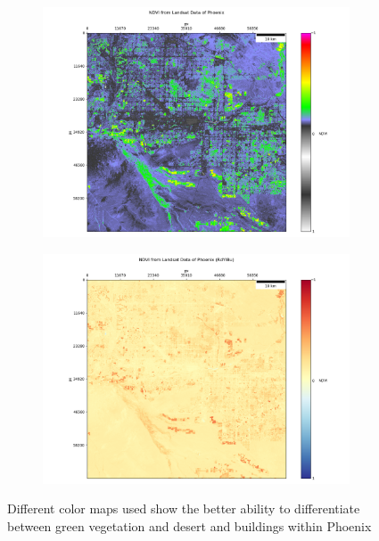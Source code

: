 \begin{figure}[htbp]
 \centering
    \begin{subfigure}{0.46\textwidth}
    \includegraphics[width=\textwidth]{img/NDVI from Landsat Data of Phoenix.png} 
    \end{subfigure}
    \begin{subfigure}{0.46\textwidth}
    \includegraphics[width=\textwidth]{img/NDVI from Landsat Data of Phoenix (RdYlBu).png} 
    \end{subfigure}
    \caption{Different color maps used show the better ability to differentiate between green vegetation and desert and buildings within Phoenix\label{fig:ndvicomp}}
\end{figure}
